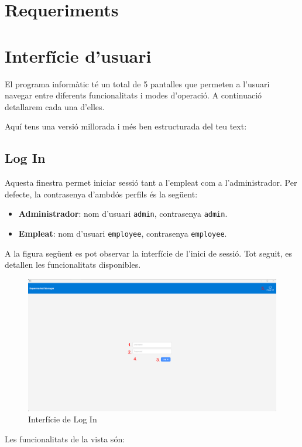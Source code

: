 \documentclass[a4paper,12pt]{article}
\begin{document}
	\section{Requeriments}
	
	\newpage
	\section{Interfície d'usuari}
	
	El programa informàtic té un total de 5 pantalles que permeten a l'usuari navegar entre diferents funcionalitats i modes d'operació. A continuació detallarem cada una d'elles.
	
	
	Aquí tens una versió millorada i més ben estructurada del teu text:
	
	\subsection{Log In}
	
	Aquesta finestra permet iniciar sessió tant a l'empleat com a l'administrador. Per defecte, la contrasenya d'ambdós perfils és la següent:
	
	\begin{itemize}
		\item \textbf{Administrador}: nom d'usuari \texttt{admin}, contrasenya \texttt{admin}.
		\item \textbf{Empleat}: nom d'usuari \texttt{employee}, contrasenya \texttt{employee}.
	\end{itemize}
	
	A la figura següent es pot observar la interfície de l'inici de sessió. Tot seguit, es detallen les funcionalitats disponibles.
	
	\begin{figure}[H] 
		\centering
		\includegraphics[width=0.75\linewidth]{assets/login.png}
		\caption{Interfície de Log In}
	\end{figure}
	
	\noindent Les funcionalitats de la vista són:
	
\end{document}
